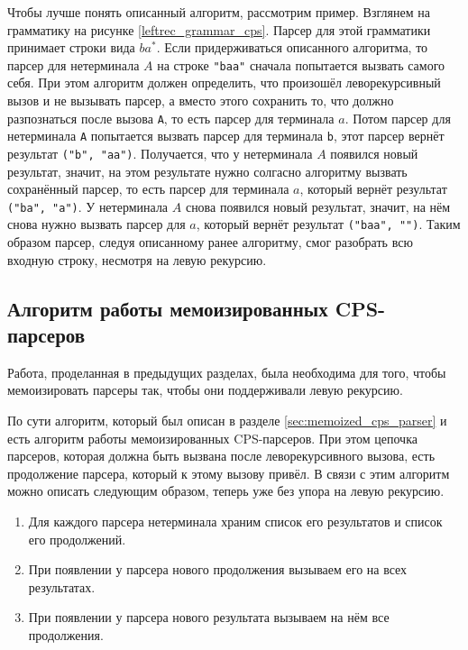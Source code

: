 \documentclass[times]{itmo-student-thesis}
\begin{document}
Чтобы лучше понять описанный алгоритм, рассмотрим пример. Взглянем на грамматику на рисунке \ref{leftrec_grammar_cps}.
Парсер для этой грамматики принимает строки вида $ba^*$. Если придерживаться описанного алгоритма, то
парсер для нетерминала $A$ на строке \lstinline{"baa"} сначала попытается вызвать самого себя.
При этом алгоритм должен определить, что произошёл леворекурсивный вызов и не вызывать парсер, а вместо этого сохранить то, что
должно разпознаться после вызова \lstinline{A}, то есть парсер для терминала $a$. Потом
парсер для нетерминала \lstinline{A} попытается вызвать парсер для терминала \lstinline{b}, этот парсер вернёт результат
\lstinline{("b", "aa")}. Получается, что у нетерминала $A$ появился новый результат, значит, на этом
результате нужно солгасно алгоритму вызвать сохранённый парсер, то есть парсер для терминала $a$,
который вернёт результат \lstinline{("ba", "a")}. У нетерминала $A$ снова появился новый результат,
значит, на нём снова нужно вызвать парсер для $a$, который вернёт результат \lstinline{("baa", "")}.
Таким образом парсер, следуя описанному ранее алгоритму, смог разобрать всю входную строку, несмотря на левую рекурсию.

\subsection{Алгоритм работы мемоизированных CPS-парсеров}\label{sec:cps_algorithm}

Работа, проделанная в предыдущих разделах, была необходима для того, чтобы мемоизировать парсеры так, чтобы они поддерживали
левую рекурсию. 

По сути алгоритм, который был описан в разделе \ref{sec:memoized_cps_parser} и есть алгоритм работы мемоизированных CPS-парсеров. 
При этом цепочка парсеров, которая должна быть вызвана после леворекурсивного вызова, есть продолжение парсера, 
который к этому вызову привёл. В связи с этим алгоритм можно описать следующим образом, теперь уже без упора на левую рекурсию.
\begin{enumerate}
    \item Для каждого парсера нетерминала храним список его результатов и список его продолжений.
    \item При появлении у парсера нового продолжения вызываем его на всех результатах.
    \item При появлении у парсера нового результата вызываем на нём все продолжения.
\end{enumerate}
\end{document}
